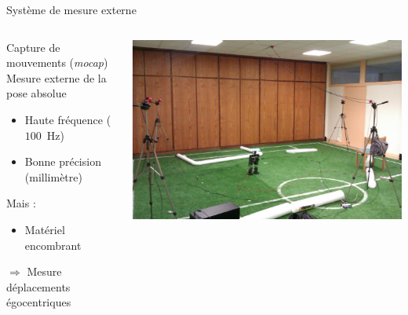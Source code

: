 
\begin{frame}{Système de mesure externe}
    \begin{columns}
        \begin{column}{0.5\linewidth}
            \begin{block}{Capture de mouvements (\textit{mocap})}
                Mesure externe de la pose absolue 
            \end{block}
            \begin{itemize}
                \item Haute fréquence ($100$~Hz)
                \item Bonne précision (millimètre)
            \end{itemize}
            Mais :
            \begin{itemize}
                \item Matériel \og encombrant \fg
            \end{itemize}
            \vspace{1em}
            $\Longrightarrow$ Mesure déplacements égocentriques
        \end{column}
        \begin{column}{0.5\linewidth}
            \includegraphics[width=1.0\linewidth]{../media/mocap_setup1.jpg}
        \end{column}
    \end{columns}
\end{frame}

